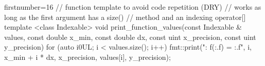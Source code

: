 \begin{cppcode*}{firstnumber=16}
// function template to avoid code repetition (DRY)
// works as long as the first argument has a size()
// method and an indexing operator[]
template <class Indexable> void print_function_values(const Indexable & values, const double x_min, const double dx, const uint x_precision, const uint y_precision) {
    for (auto i{0UL}; i < values.size(); i++) {
        fmt::print("{}: f({:.{}f}) = {:.{}f}\n", i, x_min + i * dx, x_precision, values[i], y_precision);
    }
}
\end{cppcode*}

